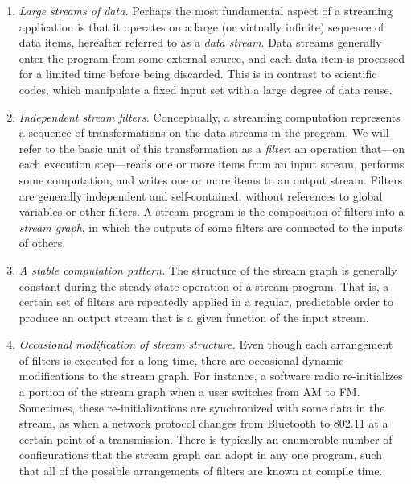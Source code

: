 \begin{enumerate}
\item \emph{Large streams of data.}  Perhaps the most fundamental
  aspect of a streaming application is that it operates on a large (or
  virtually infinite) sequence of data items, hereafter referred to as
  a \emph{data stream}.  Data streams generally enter the program from
  some external source, and each  data item is processed for a limited
  time  before being  discarded.  This  is in  contrast  to scientific
  codes, which  manipulate a  fixed input set  with a large  degree of
  data reuse.

\item \emph{Independent stream filters.}  Conceptually, a streaming
  computation  represents a  sequence of  transformations on  the data
  streams in  the program.  We  will refer to  the basic unit  of this
  transformation  as  a  \emph{filter}:  an operation  that---on  each
  execution  step---reads one  or  more items  from  an input  stream,
  performs some computation, and writes one or more items to an output
  stream.   Filters  are  generally  independent  and  self-contained,
  without references  to global variables or other  filters.  A stream
  program is the composition of filters into a \emph{stream graph}, in
  which the  outputs of  some filters are  connected to the  inputs of
  others.
  
\item \emph{A stable computation pattern.}  The structure of the
  stream graph is generally constant during the steady-state operation
  of  a  stream  program.  That  is,  a  certain  set of  filters  are
  repeatedly  applied in a  regular, predictable  order to  produce an
  output stream that is a given function of the input stream.
  
\item \emph{Occasional modification of stream structure.}  Even though
  each arrangement of  filters is executed for a  long time, there are
  occasional dynamic modifications to the stream graph.  For instance,
  a software radio re-initializes a portion of the stream graph when a
  user switches  from AM  to FM.  Sometimes,  these re-initializations
  are synchronized  with some  data in the  stream, as when  a network
  protocol changes  from Bluetooth to 802.11  at a certain  point of a
  transmission.    There  is   typically  an   enumerable   number  of
  configurations that the  stream graph can adopt in  any one program,
  such that all  of the possible arrangements of  filters are known at
  compile time.
  

\end{enumerate}
